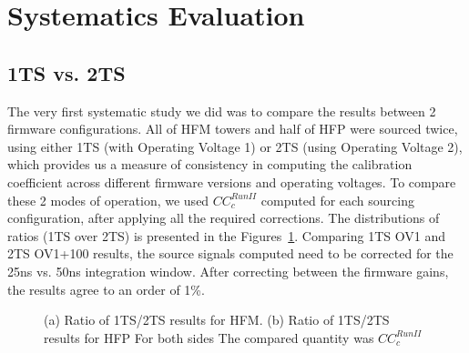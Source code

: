 \section{Systematics Evaluation}
\subsection{1TS vs. 2TS}
The very first systematic study we did was to compare the results between 2
firmware configurations. All of HFM towers and half of HFP were sourced twice,
using either 1TS (with Operating Voltage 1) or 2TS (using Operating Voltage 2),
which provides us a measure of consistency in computing the calibration
coefficient across different firmware versions and operating voltages.
To compare these 2 modes of operation, we used ${CC}^{Run II}_{c}$ computed for
each sourcing configuration, after applying all the required corrections. The
distributions of ratios (1TS over 2TS) is presented in the Figures~\ref{fig:HF_1TSto2TS}.
Comparing 1TS OV1 and 2TS OV1+100 results, the source signals computed need to be corrected
for the 25\unit{ns} vs. 50\unit{ns} integration window. After correcting between the firmware
gains, the results agree to an order of 1\%.

\begin{figure}[htb]
    \begin{center}
        \caption
        {(a) Ratio of 1TS/2TS results for HFM.
         (b) Ratio of 1TS/2TS results for HFP
         For both sides The compared quantity was ${CC}^{Run II}_{c}$}
        \label{fig:HF_1TSto2TS}
    \end{center}
\end{figure}

